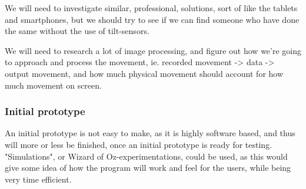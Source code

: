 We will need to investigate similar, professional, solutions, sort of like the tablets and smartphones, but we should try to see if we can find someone who have done the same without the use of tilt-sensors.
\bigskip

We will need to research a lot of image processing, and figure out how we're going to approach and process the movement, ie. recorded movement -> data -> output movement, and how much physical movement should account for how much movement on screen. 

\subsubsection*{Initial prototype}
An initial prototype is not easy to make, as it is highly software based, and thus will more or less be finished, once an initial prototype is ready for testing. "Simulations", or Wizard of Oz-experimentations, could be used, as this would give some idea of how the program will work and feel for the users, while being very time efficient.



\clearpage

\clearpage

\clearpage

\clearpage

\clearpage

\clearpage
